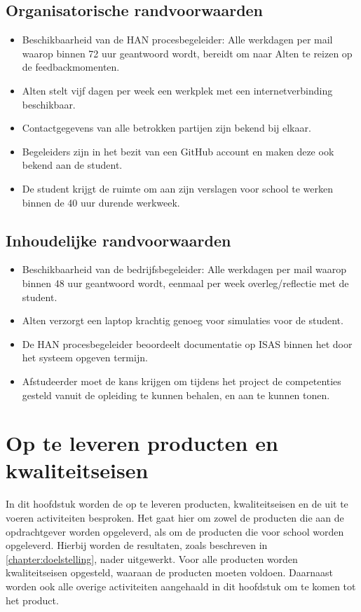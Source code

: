 \documentclass[a4paper, 11pt, oneside]{report}
\begin{document}
\section{Organisatorische randvoorwaarden}
\begin{itemize}
	\item Beschikbaarheid van de HAN procesbegeleider: Alle werkdagen per mail waarop binnen 72 uur geantwoord wordt, bereidt om naar Alten te reizen op de feedbackmomenten.
	\item Alten stelt vijf dagen per week een werkplek met een internetverbinding beschikbaar.
	\item Contactgegevens van alle betrokken partijen zijn bekend bij elkaar.
	\item Begeleiders zijn in het bezit van een GitHub account en maken deze ook bekend aan de student.
	\item De student krijgt de ruimte om aan zijn verslagen voor school te werken binnen de 40 uur durende werkweek.
	
\end{itemize}
\section{Inhoudelijke randvoorwaarden}
\begin{itemize}
	\item Beschikbaarheid van de bedrijfsbegeleider: Alle werkdagen per mail waarop binnen 48 uur geantwoord wordt, eenmaal per week overleg/reflectie met de student.
	\item Alten verzorgt een laptop krachtig genoeg voor simulaties voor de student.
	\item De HAN procesbegeleider beoordeelt documentatie op ISAS binnen het door het systeem opgeven termijn.
	\item Afstudeerder moet de kans krijgen om tijdens het project de competenties gesteld vanuit de
	opleiding te kunnen behalen, en aan te kunnen tonen.
\end{itemize}

\chapter{Op te leveren producten en kwaliteitseisen}
\label{chapter:producten}
In dit hoofdstuk worden de op te leveren producten, kwaliteitseisen en de uit te voeren activiteiten besproken.
Het gaat hier om zowel de producten die aan de opdrachtgever worden opgeleverd, als om de producten die voor school worden opgeleverd.
Hierbij worden de resultaten, zoals beschreven in \autoref{chapter:doelstelling}, nader uitgewerkt.
Voor alle producten worden kwaliteitseisen opgesteld, waaraan de producten moeten voldoen.
Daarnaast worden ook alle overige activiteiten aangehaald in dit hoofdstuk om te komen tot het product.
\end{document}
